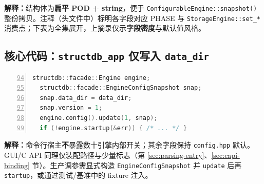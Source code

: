 \textbf{解释：}结构体为\textbf{扁平 POD + string}，便于 \texttt{ConfigurableEngine::snapshot()} 整份拷贝。注释（头文件中）标明各字段对应 PHASE 与 \texttt{StorageEngine::set\_*} 消费点；下表为全集展开，上摘录仅示\textbf{字段密度}与默认值风格。

\subsection{核心代码：\texttt{structdb\_app} 仅写入 \texttt{data\_dir}}

\begin{lstlisting}[language=C++, numbers=left, firstnumber=94]
  structdb::facade::Engine engine;
  structdb::facade::EngineConfigSnapshot snap;
  snap.data_dir = data_dir;
  snap.version = 1;
  engine.config().update(1, snap);
  if (!engine.startup(&err)) { /* ... */ }
\end{lstlisting}

\textbf{解释：}命令行宿主\textbf{不}暴露数十引擎内部开关；其余字段保持 \texttt{config.hpp} 默认。GUI/C API 同理仅装配路径与少量标志（第 \ref{sec:parsing-entry}、\ref{sec:capi-binding} 节）。生产调参需显式构造 \texttt{EngineConfigSnapshot} 并 \texttt{update} 后再 \texttt{startup}，或通过测试/基准中的 fixture 注入。
